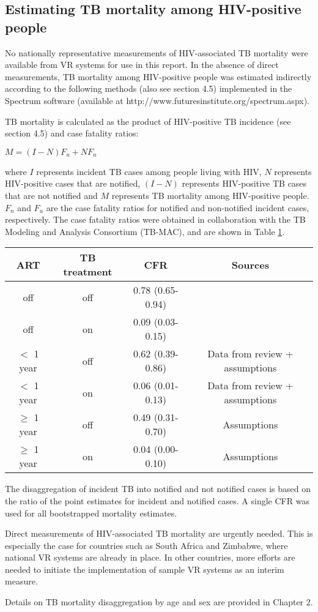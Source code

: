 \subsection{Estimating TB mortality among HIV-positive people}

No nationally representative measurements of HIV-associated TB mortality were available from VR systems for use in this report. In the absence of direct measurements, TB mortality among HIV-positive people was estimated indirectly according to the following methods (also see section 4.5) implemented in the Spectrum software (available at http://www.futuresinstitute.org/spectrum.aspx).

TB mortality is calculated as the product of HIV-positive TB incidence (see section 4.5) and case fatality ratios:

$M = (I-N)F_u + NF_n$ 									

where $I$ represents incident TB cases among people living with HIV, $N$ represents HIV-positive cases that are notified, $(I-N)$ represents HIV-positive TB cases that are not notified and $M$ represents TB mortality among HIV-positive people. $F_n$ and $F_u$ are the case fatality ratios for notified and non-notified incident cases, respectively. The case fatality ratios were obtained in collaboration with the TB Modeling and Analysis Consortium (TB-MAC), and are shown in Table \ref{tab:hivcfr}.

\begin{table} 
\label{tab:hivcfr}
    \begin{tabular}{ c c c c }
    \hline
        ART  & TB treatment & CFR & Sources \\ 
        \hline
        off            & off  & 0.78 (0.65-0.94) &  \cite{12742798} \\ 
        off            & on   & 0.09 (0.03-0.15) & \cite{21738585} \cite{11216921}\\ 
        $<$ 1 year     & off  & 0.62 (0.39-0.86) & Data from review + assumptions \\ 
        $<$ 1 year     & on   & 0.06 (0.01-0.13) & Data from review + assumptions \\ 
        $\geq$ 1 year  & off  & 0.49 (0.31-0.70) & Assumptions \\ 
        $\geq$ 1 year  & on   & 0.04 (0.00-0.10) & Assumptions \\ 
        \hline
    \end{tabular} 
\end{table}

The disaggregation of incident TB into notified and not notified cases is based on the ratio of the point estimates for incident and notified cases. A single CFR was used for all bootstrapped mortality estimates.

Direct measurements of HIV-associated TB mortality are urgently needed. This is especially the case for countries such as South Africa and Zimbabwe, where national VR systems are already in place. In other countries, more efforts are needed to initiate the implementation of sample VR systems as an interim measure.

Details on TB mortality disaggregation by age and sex are provided in Chapter 2.
